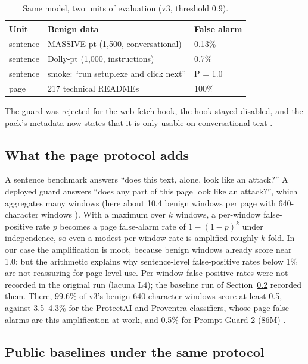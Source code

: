 \documentclass[11pt]{article}
\begin{document}
\begin{table}[tbp]
\centering
\small
\caption{Same model, two units of evaluation (v3, threshold 0.9).}\label{tab:7}
\begin{tabular}{@{}lll@{}}
\toprule
Unit & Benign data & False alarm \\
\midrule
sentence & MASSIVE-pt (1,500, conversational) & 0.13\% %
 \\
sentence & Dolly-pt (1,000, instructions) & 0.7\% %
 \\
sentence & smoke: ``run setup.exe and click next'' & P = 1.0 %
 \\
page & 217 technical READMEs & 100\% %
 \\
\bottomrule
\end{tabular}
\end{table}

The guard was rejected for the web-fetch hook, the hook stayed disabled, and the pack's metadata now states that it is only usable on conversational text%
.

\subsection{What the page protocol adds}\label{sec:5.3}

A sentence benchmark answers ``does this text, alone, look like an attack?'' A deployed guard answers ``does any part of this page look like an attack?'', which aggregates many windows (here about 10.4 benign windows per page with 640-character windows%
). With a maximum over $k$ windows, a per-window false-positive rate $p$ becomes a page false-alarm rate of $1-(1-p)^k$ under independence, so even a modest per-window rate is amplified roughly $k$-fold. In our case the amplification is moot, because benign windows already score near 1.0; but the arithmetic explains why sentence-level false-positive rates below 1\% are not reassuring for page-level use. Per-window false-positive rates were not recorded in the original run (lacuna L4); the baseline run of Section~\ref{sec:5.4} recorded them. There, 99.6\% of v3's benign 640-character windows score at least 0.5, against 3.5–4.3\% for the ProtectAI and Proventra classifiers, whose page false alarms are this amplification at work, and 0.5\% for Prompt Guard 2 (86M)%
.

\subsection{Public baselines under the same protocol}\label{sec:5.4}
\end{document}
